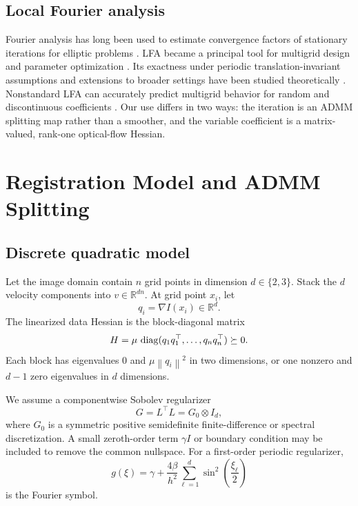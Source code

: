 \documentclass[pdflatex,iicol,sn-mathphys-num]{sn-jnl}
\theoremstyle{definition}\newtheorem{definition}[theorem]{Definition}\newtheorem{remark}[theorem]{Remark}
\newcommand{\R}{\mathbb{R}}\newcommand{\I}{\mathbf{I}}\newcommand{\norm}[1]{\left\lVert #1\right\rVert}
\begin{document}
\subsection{Local Fourier analysis}
Fourier analysis has long been used to estimate convergence factors of stationary iterations for elliptic problems \cite{ChanElman1989}. LFA became a principal tool for multigrid design and parameter optimization \cite{WienandsJoppich2005}. Its exactness under periodic translation-invariant assumptions and extensions to broader settings have been studied theoretically \cite{Rodrigo2017}. Nonstandard LFA can accurately predict multigrid behavior for random and discontinuous coefficients \cite{Kumar2019}. Our use differs in two ways: the iteration is an ADMM splitting map rather than a smoother, and the variable coefficient is a matrix-valued, rank-one optical-flow Hessian.

\section{Registration Model and ADMM Splitting}
\subsection{Discrete quadratic model}
Let the image domain contain $n$ grid points in dimension $d\in\{2,3\}$. Stack the $d$ velocity components into $v\in\R^{dn}$. At grid point $x_i$, let
\[
q_i=\nabla I(x_i)\in\R^d.
\]
The linearized data Hessian is the block-diagonal matrix
\begin{equation}
H=\mu\,\operatorname{diag}(q_1q_1^\top,\ldots,q_nq_n^\top)\succeq0.
\label{eq:H}
\end{equation}
Each block has eigenvalues $0$ and $\mu\norm{q_i}^2$ in two dimensions, or one nonzero and $d-1$ zero eigenvalues in $d$ dimensions.

We assume a componentwise Sobolev regularizer
\begin{equation}
G=L^\top L = G_0\otimes I_d,
\label{eq:G}
\end{equation}
where $G_0$ is a symmetric positive semidefinite finite-difference or spectral discretization. A small zeroth-order term $\gamma I$ or boundary condition may be included to remove the common nullspace. For a first-order periodic regularizer,
\begin{equation}
g(\xi)=\gamma+\frac{4\beta}{h^2}\sum_{\ell=1}^{d}\sin^2\left(\frac{\xi_\ell}{2}\right)
\label{eq:regularizer_symbol}
\end{equation}
 is the Fourier symbol.
\end{document}
